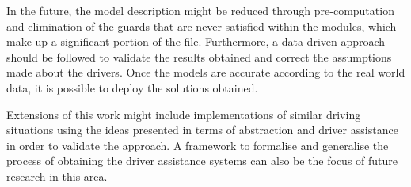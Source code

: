In the future, the model description might be reduced through pre-computation and elimination of the guards that are never satisfied within the modules, which make up a significant portion of the file. Furthermore, a data driven approach should be followed to validate the results obtained and correct the assumptions made about the drivers. Once the models are accurate according to the real world data, it is possible to deploy the solutions obtained.

Extensions of this work might include implementations of similar driving situations using the ideas presented in terms of abstraction and driver assistance in order to validate the approach. A framework to formalise and generalise the process of obtaining the driver assistance systems can also be the focus of future research in this area. 








